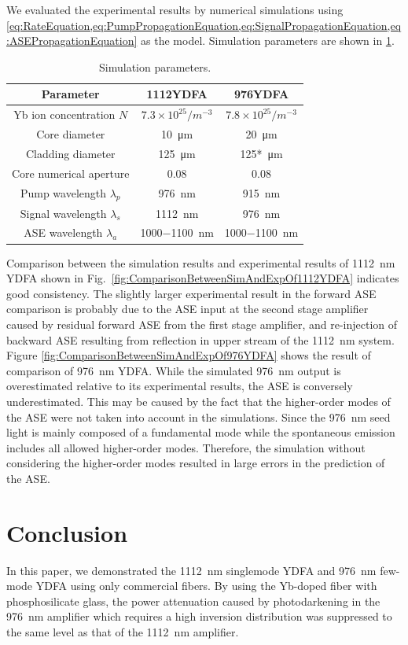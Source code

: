 \documentclass{osa-article}
\begin{document}
We evaluated the experimental results by numerical simulations using \cref{eq:RateEquation,eq:PumpPropagationEquation,eq:SignalPropagationEquation,eq:ASEPropagationEquation} as the model.
Simulation parameters are shown in \cref{tab:SimulationParameters}.
\begin{table}[htbp]
  \caption{Simulation parameters.}
  \label{tab:SimulationParameters}
  \centering
  \begin{tabular}{ccc}
    \hline
    Parameter & 1112YDFA & 976YDFA \\
    \hline \hline
    Yb ion concentration $N$ & $7.3 \times 10^{25}/\si{m^{-3}}$ & $7.8 \times 10^{25}/\si{m^{-3}}$ \\
    Core diameter & \SI{10}{\um} & \SI{20}{\um} \\
    Cladding diameter & \SI{125}{\um} & \SI{125*}{\um} \\
    Core numerical aperture & 0.08 & 0.08 \\
    Pump wavelength $\lambda_{p}$ & \SI{976}{\nm} & \SI{915}{\nm} \\
    Signal wavelength $\lambda_{s}$ & \SI{1112}{\nm} & \SI{976}{\nm} \\
    ASE wavelength $\lambda_{a}$ & \SI{1000-1100}{\nm} & \SI{1000-1100}{\nm} \\
  \end{tabular}
\end{table}
Comparison between the simulation results and experimental results of \SI{1112}{\nm} YDFA shown in Fig.~\ref{fig:ComparisonBetweenSimAndExpOf1112YDFA} indicates good consistency.
The slightly larger experimental result in the forward ASE comparison is probably due to the ASE input at the second stage amplifier caused by residual forward ASE from the first stage amplifier, and re-injection of backward ASE resulting from reflection in upper stream of the \SI{1112}{\nm} system.
Figure \cref{fig:ComparisonBetweenSimAndExpOf976YDFA} shows the result of comparison of \SI{976}{\nm} YDFA.
While the simulated \SI{976}{\nm} output is overestimated relative to its experimental results, the ASE is conversely underestimated.
This may be caused by the fact that the higher-order modes of the ASE were not taken into account in the simulations.
Since the \SI{976}{\nm} seed light is mainly composed of a fundamental mode while the spontaneous emission includes all allowed higher-order modes.
Therefore, the simulation without considering the higher-order modes resulted in large errors in the prediction of the ASE.

\section{Conclusion}
In this paper, we demonstrated the \SI{1112}{\nm} singlemode YDFA and \SI{976}{\nm} few-mode YDFA using only commercial fibers.
By using the Yb-doped fiber with phosphosilicate glass, the power attenuation caused by photodarkening in the \SI{976}{\nm} amplifier which requires a high inversion distribution was suppressed to the same level as that of the \SI{1112}{\nm} amplifier.
\end{document}
